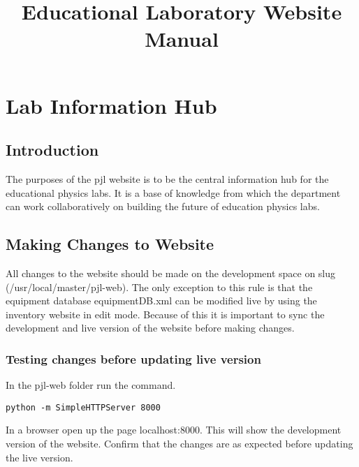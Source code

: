 \documentclass[justified]{book}
\begin{document}


\title{Educational Laboratory Website Manual}
\maketitle
\tableofcontents

\chapter{Lab Information Hub}

\section{Introduction}

The purposes of the pjl website is to be the central information hub for the educational physics labs. It is a base of knowledge from which the department can work collaboratively on building the future of education physics labs.

\newpage

\section{Making Changes to Website}

All changes to the website should be made on the development space on slug (/usr/local/master/pjl-web). The only exception to this rule is that the equipment database equipmentDB.xml can be modified live by using the inventory website in edit mode. Because of this it is important to sync the development and live version of the website before making changes.

\subsection{Testing changes before updating live version}

In the pjl-web folder run the command.

\begin{lstlisting}[backgroundcolor = \color{light-gray}]
python -m SimpleHTTPServer 8000
\end{lstlisting}

In a browser open up the page localhost:8000. This will show the development version of the website. Confirm that the changes are as expected before updating the live version.
\end{document}
